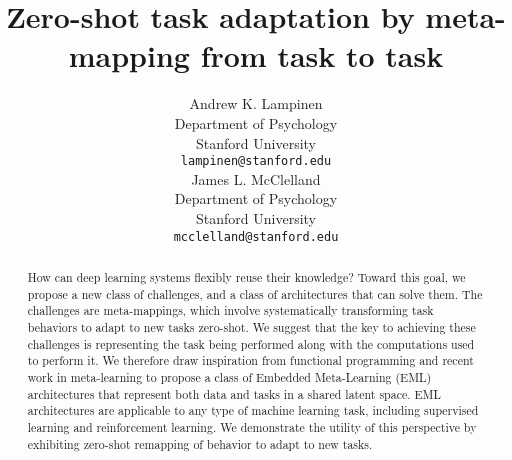 \documentclass{article}
\begin{document}
\title{Zero-shot task adaptation by meta-mapping from task to task}
\author{%
Andrew K. Lampinen\\
Department of Psychology\\
Stanford University\\
\texttt{lampinen@stanford.edu}\\
\And
James L. McClelland\\
Department of Psychology\\
Stanford University\\
\texttt{mcclelland@stanford.edu}\\
}
\date{}
\maketitle

\begin{abstract}
How can deep learning systems flexibly reuse their knowledge? Toward this goal, we propose a new class of challenges, and a class of architectures that can solve them. The challenges are meta-mappings, which involve systematically transforming task behaviors to adapt to new tasks zero-shot. We suggest that the key to achieving these challenges is representing the task being performed along with the computations used to perform it. We therefore draw inspiration from functional programming and recent work in meta-learning to propose a class of Embedded Meta-Learning (EML) architectures that represent both data and tasks in a shared latent space. EML architectures are applicable to any type of machine learning task, including supervised learning and reinforcement learning. We demonstrate the utility of this perspective by exhibiting zero-shot remapping of behavior to adapt to new tasks.
\end{abstract}

\vspace{-0.75em} %
\end{document}
